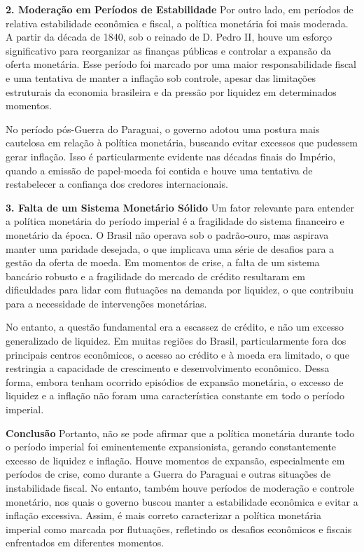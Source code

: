 \documentclass[a4paper,12pt]{article}[abntex2]
\begin{document}
\textbf{2. Moderação em Períodos de Estabilidade}
Por outro lado, em períodos de relativa estabilidade econômica e fiscal, a política monetária foi mais moderada. A partir da década de 1840, sob o reinado de D. Pedro II, houve um esforço significativo para reorganizar as finanças públicas e controlar a expansão da oferta monetária. Esse período foi marcado por uma maior responsabilidade fiscal e uma tentativa de manter a inflação sob controle, apesar das limitações estruturais da economia brasileira e da pressão por liquidez em determinados momentos.

No período pós-Guerra do Paraguai, o governo adotou uma postura mais cautelosa em relação à política monetária, buscando evitar excessos que pudessem gerar inflação. Isso é particularmente evidente nas décadas finais do Império, quando a emissão de papel-moeda foi contida e houve uma tentativa de restabelecer a confiança dos credores internacionais.

\textbf{3. Falta de um Sistema Monetário Sólido}
Um fator relevante para entender a política monetária do período imperial é a fragilidade do sistema financeiro e monetário da época. O Brasil não operava sob o padrão-ouro, mas aspirava manter uma paridade desejada, o que implicava uma série de desafios para a gestão da oferta de moeda. Em momentos de crise, a falta de um sistema bancário robusto e a fragilidade do mercado de crédito resultaram em dificuldades para lidar com flutuações na demanda por liquidez, o que contribuiu para a necessidade de intervenções monetárias.

No entanto, a questão fundamental era a escassez de crédito, e não um excesso generalizado de liquidez. Em muitas regiões do Brasil, particularmente fora dos principais centros econômicos, o acesso ao crédito e à moeda era limitado, o que restringia a capacidade de crescimento e desenvolvimento econômico. Dessa forma, embora tenham ocorrido episódios de expansão monetária, o excesso de liquidez e a inflação não foram uma característica constante em todo o período imperial.

\textbf{Conclusão}
Portanto, não se pode afirmar que a política monetária durante todo o período imperial foi eminentemente expansionista, gerando constantemente excesso de liquidez e inflação. Houve momentos de expansão, especialmente em períodos de crise, como durante a Guerra do Paraguai e outras situações de instabilidade fiscal. No entanto, também houve períodos de moderação e controle monetário, nos quais o governo buscou manter a estabilidade econômica e evitar a inflação excessiva. Assim, é mais correto caracterizar a política monetária imperial como marcada por flutuações, refletindo os desafios econômicos e fiscais enfrentados em diferentes momentos.
\end{document}
